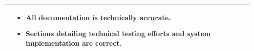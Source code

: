 \documentclass[10pt, a4paper]{report}
\begin{document}
\begin{longtable}{|>{\small\raggedright\arraybackslash}p{4cm}|>{\raggedright\arraybackslash}p{3cm}|>{\raggedright\arraybackslash}p{5cm}|>{\raggedright\arraybackslash}p{5cm}|}
\begin{itemize}[noitemsep, topsep=0pt, partopsep=0pt, leftmargin=*]
    \end{itemize} & 
    \begin{itemize}[noitemsep, topsep=0pt, partopsep=0pt, leftmargin=*]
        \item All documentation is technically accurate.
        \item Sections detailing technical testing efforts and system implementation are correct.
    \end{itemize} \\ \hline

\end{longtable}
\end{document}
